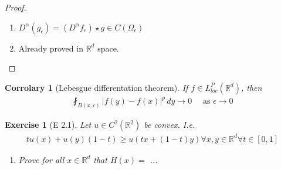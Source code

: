 \documentclass{report}
\theoremstyle{tommy}
\newtheorem{cor}[defn]{Corrolary}
\newtheorem{ex}[defn]{Exercise}
\begin{document}
  \begin{proof}
    \begin{enumerate}[label=\alph*)]
      \item \(D^\alpha(g_\epsilon) = (D^\alpha f_\epsilon) \star g \in C(\Omega_\epsilon)\)
      \item Already proved in \(\mathbb{R}^d\) space.
    \end{enumerate}
  \end{proof}

  
  \begin{cor}[Lebesgue differentation theorem]
    If \(f \in L_{loc}^P(\mathbb{R}^d)\), then
    \begin{align*}
      \fint_{B(x, \epsilon)} |f(y) - f(x)|^p \, dy \to 0 \quad \text{ as } \epsilon \to 0
    \end{align*}
  \end{cor}


  \begin{ex}[E 2.1]
    Let \(u \in C^2(\mathbb{R}^2)\) be convex. I.e.
    \begin{align*}
      t u(x) + u(y) (1-t) \ge u(tx + (1-t)y) \forall x,y \in \mathbb{R}^d \forall t \in [0,1]
    \end{align*}
    \begin{enumerate}[label=\alph*)]
      \item Prove for all \(x \in \mathbb{R}^d\) that \(H(x) =  \) ...
    \end{enumerate}
  \end{ex}
  
\end{document}
